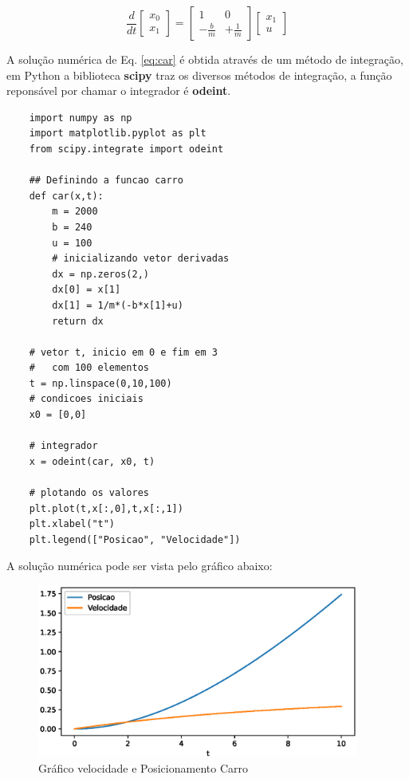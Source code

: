 \begin{equation}\label{eq:car}
    \frac{d}{dt}\begin{bmatrix} x_0 \\ x_1 \end{bmatrix} = 
    \begin{bmatrix} 1 & 0\\ -\displaystyle\frac{b}{m} & +\displaystyle\frac{1}{m} \end{bmatrix}
    \begin{bmatrix} x_1 \\ u \end{bmatrix}    
\end{equation}

A solução numérica de Eq. \ref{eq:car} é obtida através de um método de integração, em Python a biblioteca \textbf{scipy} traz
os diversos métodos de integração, a função reponsável por chamar o integrador é \textbf{odeint}.

\begin{lstlisting}
    import numpy as np
    import matplotlib.pyplot as plt
    from scipy.integrate import odeint

    ## Definindo a funcao carro
    def car(x,t):
        m = 2000
        b = 240
        u = 100
        # inicializando vetor derivadas
        dx = np.zeros(2,)
        dx[0] = x[1]
        dx[1] = 1/m*(-b*x[1]+u)
        return dx

    # vetor t, inicio em 0 e fim em 3
    #   com 100 elementos
    t = np.linspace(0,10,100)
    # condicoes iniciais
    x0 = [0,0]

    # integrador
    x = odeint(car, x0, t)

    # plotando os valores
    plt.plot(t,x[:,0],t,x[:,1])
    plt.xlabel("t")
    plt.legend(["Posicao", "Velocidade"]) 
\end{lstlisting}

A solução numérica pode ser vista pelo gráfico abaixo:

\begin{figure}[htb]
    \includegraphics[width=300pt]{chapters/chapter0/figures/exercice_car.eps}
    \caption[Modelo Dinâmico Carro]{Gráfico velocidade e Posicionamento Carro}
\end{figure}

